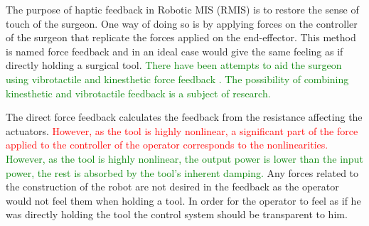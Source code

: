 The purpose of haptic feedback in Robotic MIS (RMIS) is to restore the sense of touch of the surgeon. One way of doing so is by applying forces on the controller of the surgeon that replicate the forces applied on the end-effector. This method is named force feedback and in an ideal case would give the same feeling as if directly holding a surgical tool. \textcolor{green}{There have been attempts to aid the surgeon using vibrotactile\cite{tactile1}\cite{tactile2} and kinesthetic force feedback \cite{force_feedback_surgery}\cite{tactile_summary}. The possibility of combining kinesthetic and vibrotactile feedback is a subject of research\cite{tactile3}.}

 The direct force feedback calculates the feedback from the resistance affecting the actuators. \textcolor{red}{However, as the tool is highly nonlinear, a significant part of the force applied to the controller of the operator corresponds to the nonlinearities.}
\textcolor{green}{However, as the tool is highly nonlinear, the output power is lower than the input power, the rest is absorbed by the tool's inherent damping.}
 Any forces related to the construction of the robot are not desired in the feedback as the operator would not feel them when holding a tool. In order for the operator to feel as if he was directly holding the tool the control system should be transparent to him.



